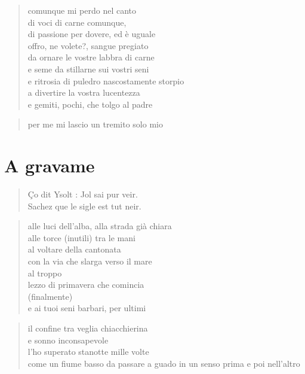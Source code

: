 \clearpage


\begin{verse}
    comunque mi perdo nel canto\\
    di voci di carne comunque,\\
    di passione per dovere, ed è uguale\\
    offro, ne volete?, sangue pregiato\\
    da ornare le vostre labbra di carne\\
    e seme da stillarne sui vostri seni\\
    e ritrosia di puledro nascostamente storpio\\
    a divertire la vostra lucentezza\\
    e gemiti, pochi, che tolgo al padre
\end{verse}

\begin{verse}
    per me mi lascio un tremito solo mio
\end{verse}
\chapter*{A gravame}

\begin{verse}
    \begin{otherlanguage}{french}
        Ço dit Ysolt : Jol sai pur veir.\\
        Sachez que le sigle est tut neir.
    \end{otherlanguage}
\end{verse}


\begin{verse}
    alle luci dell'alba, alla strada già chiara\\
    alle torce (inutili) tra le mani\\
    al voltare della cantonata\\
    con la via che slarga verso il mare\\
    al troppo\\
    lezzo di primavera che comincia\\
    (finalmente)\\
    e ai tuoi seni barbari, per ultimi
\end{verse}

\clearpage


\begin{verse}
    il confine tra veglia chiacchierina\\
    e sonno inconsapevole\\
    l’ho superato stanotte mille volte\\
    come un fiume basso da passare a guado
    in un senso prima e poi nell’altro
\end{verse}

